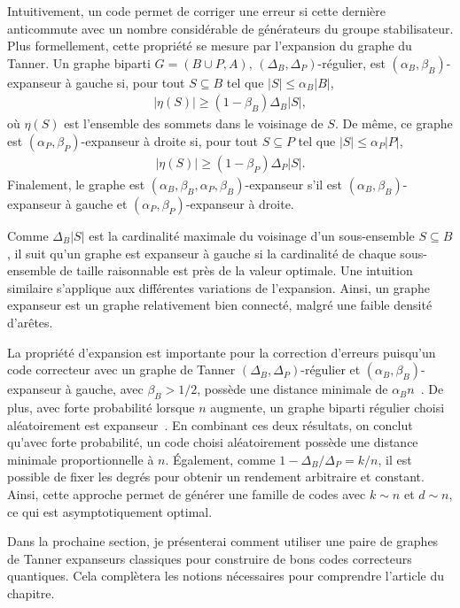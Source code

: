Intuitivement,
un code permet de corriger une erreur si cette dernière anticommute avec un nombre 
considérable de générateurs du groupe stabilisateur.
Plus formellement,
cette propriété se mesure par l'expansion du graphe du Tanner.
Un graphe biparti $G = (B\cup P, A)$, $(\Delta_B, \Delta_P)$-régulier,
est $(\alpha_B, \beta_B)$-expanseur à gauche si,
pour tout $S \subseteq B$ tel que $|S| \leq \alpha_B |B|$,
\begin{align}
	|\eta(S)| \geq (1 - \beta_B) \Delta_B |S|,
\end{align}
où $\eta(S)$ est l'ensemble des sommets dans le voisinage de $S$.
De même,
ce graphe est $(\alpha_P, \beta_P)$-expanseur à droite si,
pour tout $S \subseteq P$ tel que $|S| \leq \alpha_P |P|$,
\begin{align}
	|\eta(S)| \geq (1 - \beta_P) \Delta_P |S|.
\end{align}
Finalement,
le graphe est $(\alpha_B, \beta_B, \alpha_P, \beta_B)$-expanseur
s'il est $(\alpha_B, \beta_B)$-expanseur à gauche
et $(\alpha_P, \beta_P)$-expanseur à droite.

Comme $\Delta_B|S|$ est la cardinalité maximale du voisinage d'un
sous-ensemble $S \subseteq B$,
il suit qu'un graphe est expanseur à gauche si la cardinalité de 
chaque sous-ensemble de taille raisonnable est près de la valeur optimale.
Une intuition similaire s'applique aux différentes variations de l'expansion.
Ainsi,
un graphe expanseur est un graphe relativement bien connecté,
malgré une faible densité d'arêtes.

La propriété d'expansion est importante pour la correction d'erreurs puisqu'un code correcteur
avec un graphe de Tanner $(\Delta_B, \Delta_P)$-régulier et $(\alpha_B, \beta_B)$-expanseur à gauche,
avec $\beta_B > 1/2$,
possède une distance minimale de $\alpha_B n$~\cite{sipser_expander_1996}.
De plus,
avec forte probabilité lorsque $n$ augmente,
un graphe biparti régulier choisi aléatoirement est expanseur~\cite{sipser_expander_1996}.
En combinant ces deux résultats,
on conclut qu'avec forte probabilité,
un code choisi aléatoirement possède une distance minimale proportionnelle à $n$.
Également, comme $1 - \Delta_B / \Delta_P = k/n$,
il est possible de fixer les degrés pour obtenir un rendement arbitraire et constant.
Ainsi,
cette approche permet de générer une famille de codes avec $k \sim n$ et $d \sim n$,
ce qui est asymptotiquement optimal.

Dans la prochaine section,
je présenterai comment utiliser une paire de graphes de Tanner expanseurs classiques
pour construire de bons codes correcteurs quantiques.
Cela complètera les notions nécessaires pour comprendre l'article du chapitre.

